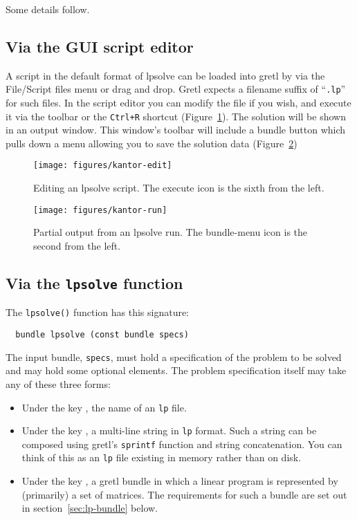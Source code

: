 \documentclass{article}
\begin{document}
Some details follow.

\subsection{Via the GUI script editor}

A script in the default format of \textsf{lpsolve} can be loaded into
gretl by via the \textsf{File/Script files} menu or drag and drop.
Gretl expects a filename suffix of ``\texttt{.lp}'' for such files.
In the script editor you can modify the file if you wish, and execute
it via the toolbar or the \texttt{Ctrl+R} shortcut
(Figure~\ref{fig:kantor1}). The solution will be shown in an output
window. This window's toolbar will include a bundle button which pulls
down a menu allowing you to save the solution data
(Figure~\ref{fig:kantor2})

\begin{figure}[p]
  \centering
  \texttt{[image: figures/kantor-edit]}
  \caption{Editing an \textsf{lpsolve} script. The execute icon is the
    sixth from the left.}
  \label{fig:kantor1}
\end{figure}

\begin{figure}[p]
  \centering
  \texttt{[image: figures/kantor-run]}
  \caption{Partial output from an \textsf{lpsolve} run. The
    bundle-menu icon is the second from the left.}
  \label{fig:kantor2}
\end{figure}

\subsection{Via the \texttt{lpsolve} function}

The \texttt{lpsolve()} function has this signature:
\begin{verbatim}
  bundle lpsolve (const bundle specs)
\end{verbatim}

The input bundle, \texttt{specs}, must hold a specification of the
problem to be solved and may hold some optional elements.  The
problem specification itself may take any of these three forms:
\begin{itemize}
\item Under the key , the name of an \texttt{lp}
  file.
\item Under the key , a multi-line string in
  \texttt{lp} format. Such a string can be composed using gretl's
  \texttt{sprintf} function and string concatenation. You can think of
  this as an \texttt{lp} file existing in memory rather than on disk.
\item Under the key , a gretl bundle in which a
  linear program is represented by (primarily) a set of matrices. The
  requirements for such a bundle are set out in
  section~\ref{sec:lp-bundle} below.
\end{itemize}
\end{document}
